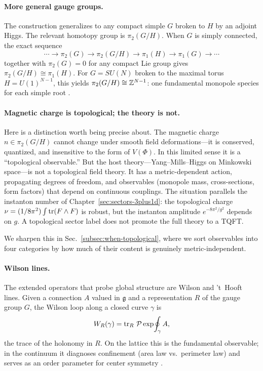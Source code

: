 \paragraph{More general gauge groups.}
The construction generalizes to any compact simple $G$ broken to $H$ by an adjoint Higgs. The relevant homotopy group is $\pi_2(G/H)$. When $G$ is simply connected, the exact sequence
\begin{equation}
  \cdots \to \pi_2(G) \to \pi_2(G/H) \to \pi_1(H) \to \pi_1(G) \to \cdots
  \label{eq:exact-sequence-monopole}
\end{equation}
together with $\pi_2(G)=0$ for any compact Lie group gives $\pi_2(G/H)\cong\pi_1(H)$. For $G=SU(N)$ broken to the maximal torus $H=U(1)^{N-1}$, this yields $\pi_2(G/H)\cong\mathbb{Z}^{N-1}$: one fundamental monopole species for each simple root \cite{WeinbergClassicalSolutionsQFT,Rajantie2024MonopoleTheoryOverview}.

\paragraph{Magnetic charge is topological; the theory is not.}
Here is a distinction worth being precise about. The magnetic charge $n\in\pi_2(G/H)$ cannot change under smooth field deformations---it is conserved, quantized, and insensitive to the form of $V(\Phi)$. In this limited sense it is a ``topological observable.'' But the host theory---Yang--Mills--Higgs on Minkowski space---is not a topological field theory. It has a metric-dependent action, propagating degrees of freedom, and observables (monopole mass, cross-sections, form factors) that depend on continuous couplings. The situation parallels the instanton number of Chapter~\ref{sec:sectors-3plus1d}: the topological charge $\nu = (1/8\pi^2)\int\operatorname{tr}(F\wedge F)$ is robust, but the instanton amplitude $e^{-8\pi^2/g^2}$ depends on $g$. A topological sector label does not promote the full theory to a TQFT.

We sharpen this in Sec.~\ref{subsec:when-topological}, where we sort observables into four categories by how much of their content is genuinely metric-independent.

\paragraph{Wilson lines.}
The extended operators that probe global structure are Wilson and 't~Hooft lines. Given a connection $A$ valued in $\mathfrak{g}$ and a representation $R$ of the gauge group $G$, the Wilson loop along a closed curve $\gamma$ is
\begin{equation}
  W_R(\gamma) = \operatorname{tr}_R\,\mathcal{P}\exp\!\oint_\gamma A,
  \label{eq:wilson-loop}
\end{equation}
the trace of the holonomy in $R$. On the lattice this is the fundamental observable; in the continuum it diagnoses confinement (area law vs.~perimeter law) and serves as an order parameter for center symmetry \cite{GaiottoKapustinSeibergWillett2015GeneralizedSymmetries}.

